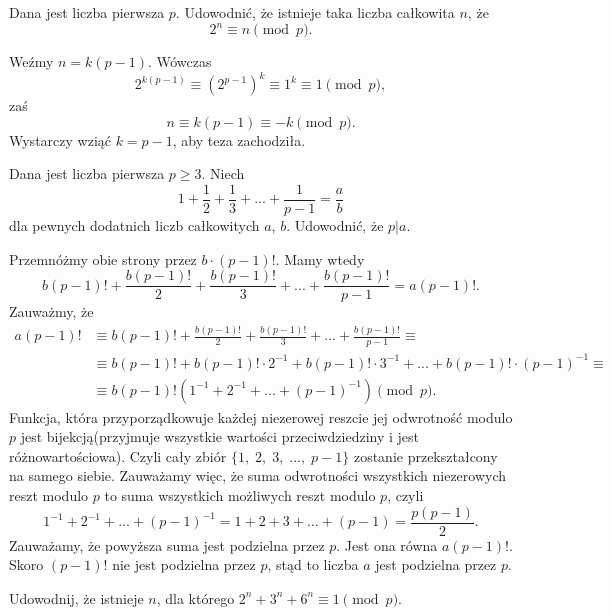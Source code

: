 \newpage
{}

\begin{problem}{1} 
	Dana jest liczba pierwsza $p$. Udowodnić, że istnieje taka liczba całkowita $n$, że 
	\[
		2^n \equiv n \pmod{p}.
	\]
\end{problem}

\noindent
Weźmy $n = k(p - 1)$. Wówczas 
\[
	2^{k(p-1)}\equiv (2^{p-1})^k \equiv 1^k \equiv 1 \pmod{p},
\]
zaś
\[
	n \equiv k(p - 1) \equiv -k \pmod{p}.
\]
Wystarczy wziąć $k = p - 1$, aby teza zachodziła.\\

\begin{problem}{2}
	Dana jest liczba pierwsza $p\geqslant 3$. Niech 
	\[
		1 + \frac{1}{2} + \frac{1}{3} + ... + \frac{1}{p-1} = \frac{a}{b}
	\]
	dla pewnych dodatnich liczb całkowitych $a$, $b$.
	Udowodnić, że $p\big| a$.
\end{problem}

\noindent
Przemnóżmy obie strony przez $b \cdot (p - 1)!$. Mamy wtedy 
\[
	b(p - 1)! + \frac{b(p - 1)!}{2} + \frac{b(p - 1)!}{3} + ...+\frac{b(p - 1)!}{p-1} = a(p - 1)!.
\] 
Zauważmy, że
\begin{align*}
	a(p - 1)! &\equiv b(p - 1)! + \frac{b(p - 1)!}{2} + \frac{b(p - 1)!}{3} + ...+\frac{b(p - 1)!}{p-1} \equiv \\
	&\equiv b(p - 1)! + b(p - 1)! \cdot 2^{-1} + b(p - 1)! \cdot 3^{-1} + ... + b(p - 1)!  \cdot (p - 1)^{-1} \equiv \\
	&\equiv b(p - 1)!(1^{-1}+2^{-1}+...+(p-1)^{-1}) \pmod{p}.
\end{align*}
Funkcja, która przyporządkowuje każdej niezerowej reszcie jej odwrotność modulo $p$ jest bijekcją(przyjmuje wszystkie wartości przeciwdziedziny i jest różnowartościowa). Czyli cały zbiór $\{1,\; 2,\; 3,\; ...,\; p-1\}$ zostanie przekształcony na samego siebie.
Zauważamy więc, że suma odwrotności wszystkich niezerowych reszt modulo $p$ to suma wszystkich możliwych reszt modulo $p$, czyli 
\[
	1^{-1} + 2^{-1} + ... + (p-1)^{-1} = 1 + 2 + 3 + ... + (p-1) = \frac{p(p-1)}{2}.
\] Zauważamy, że powyższa suma jest podzielna przez $p$. Jest ona równa $a(p - 1)!$. Skoro $(p - 1)!$ nie jest podzielna przez $p$, stąd to liczba $a$ jest podzielna przez $p$.

\begin{problem}{3}
	Udowodnij, że istnieje $n$, dla którego $2^n+3^n+6^n\equiv 1 \pmod{p}.$
\end{problem}

